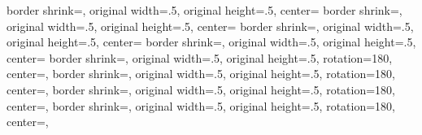 %
%
%
%
%
%
{%
	\edef\pgfpageoptionheight{\the\paperheight}%
	\edef\pgfpageoptionwidth{\the\paperwidth}%
	\edef\pgfpageoptionborder{1pt}%
}
{%
  {%
    border shrink=\pgfpageoptionborder,%
	original width=.5\pgfpageoptionheight,%
	original height=.5\pgfpageoptionwidth,%
    center=\pgfpoint{0\pgfphysicalwidth}{\pgfphysicalheight}%
  }%
  {%
    border shrink=\pgfpageoptionborder,%
	original width=.5\pgfpageoptionheight,%
	original height=.5\pgfpageoptionwidth,%
    center=\pgfpoint{.5\pgfphysicalwidth}{\pgfphysicalheight}%
  }%
  {%
    border shrink=\pgfpageoptionborder,%
	original width=.5\pgfpageoptionheight,%
	original height=.5\pgfpageoptionwidth,%
    center=\pgfpoint{0\pgfphysicalwidth}{.5\pgfphysicalheight}%
  }%
  {%
    border shrink=\pgfpageoptionborder,%
	original width=.5\pgfpageoptionheight,%
	original height=.5\pgfpageoptionwidth,%
    center=\pgfpoint{.5\pgfphysicalwidth}{.5\pgfphysicalheight}%
  }%
  {%
  	border shrink=\pgfpageoptionborder,%
	original width=.5\pgfpageoptionheight,%
	original height=.5\pgfpageoptionwidth,%
	rotation=180,%
    center=\pgfpoint{\pgfphysicalwidth}{.5\pgfphysicalheight},%
  }%
  {%
  	border shrink=\pgfpageoptionborder,%
	original width=.5\pgfpageoptionheight,%
	original height=.5\pgfpageoptionwidth,%
	rotation=180,%
    center=\pgfpoint{.5\pgfphysicalwidth}{.5\pgfphysicalheight},%
  }%
  {%
	border shrink=\pgfpageoptionborder,%
	original width=.5\pgfpageoptionheight,%
	original height=.5\pgfpageoptionwidth,%
	rotation=180,%
    center=\pgfpoint{\pgfphysicalwidth}{0\pgfphysicalheight},%
  }%
  {%
	border shrink=\pgfpageoptionborder,%
	original width=.5\pgfpageoptionheight,%
	original height=.5\pgfpageoptionwidth,%
	rotation=180,%
    center=\pgfpoint{.5\pgfphysicalwidth}{0\pgfphysicalheight},%
  }%
}%